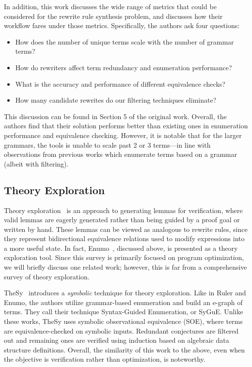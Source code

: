 \documentclass[acmsmall,screen,nonacm]{acmart}
\begin{document}
In addition, this work discusses the wide range of metrics that could be considered for the rewrite rule synthesis problem, and discusses how their workflow fares under those metrics. Specifically, the authors ask four questions:
\begin{itemize}
    \item How does the number of unique terms scale with the number of grammar terms?
    \item How do rewriters affect term redundancy and enumeration performance?
    \item What is the accuracy and performance of different equivalence checks?
    \item How many candidate rewrites do our filtering techniques eliminate?
\end{itemize}

This discussion can be found in Section 5 of the original work. Overall, the authors find that their solution performs better than existing ones in enumeration performance and equivalence checking. However, it is notable that for the larger grammars, the tools is unable to scale past 2 or 3 terms---in line with observations from previous works which enumerate terms based on a grammar (albeit with filtering).


\subsection{Theory Exploration}
Theory exploration~\cite{buchberger2000theorema, buchberger2006theorema} is an approach to generating lemmas for verification, where valid lemmas are eagerly generated rather than being guided by a proof goal or written by hand.
These lemmas can be viewed as analogous to rewrite rules, since they represent bidirectional equivalence relations used to modify expressions into a more useful state.
In fact, Enumo~\cite{pal2023enumo}, discussed above, is presented as a theory exploration tool.
Since this survey is primarily focused on program optimization, we will briefly discuss one related work; however, this is far from a comprehensive survey of theory exploration.

TheSy~\cite{singher2021thesy} introduces a \emph{symbolic} technique for theory exploration. Like in Ruler and Enumo, the authors utilize grammar-based enumeration and build an e-graph of terms. They call their technique Syntax-Guided Enumeration, or SyGuE.
Unlike these works, TheSy uses symbolic observational equivalence (SOE), where terms are equivalence-checked on symbolic inputs. Redundant conjectures are filtered out and remaining ones are verified using induction based on algebraic data structure definitions. Overall, the similarity of this work to the above, even when the objective is verification rather than optimization, is noteworthy.
\end{document}
